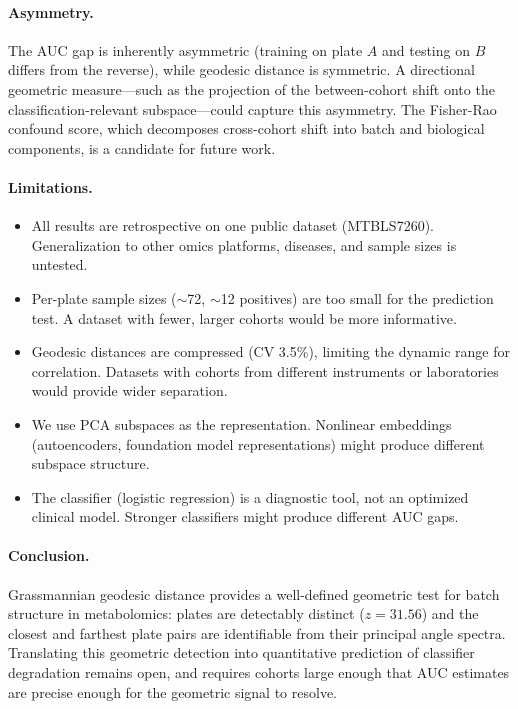 \documentclass{article}
\begin{document}
\paragraph{Asymmetry.} The AUC gap is inherently asymmetric (training on plate $A$ and testing on $B$ differs from the reverse), while geodesic distance is symmetric. A directional geometric measure---such as the projection of the between-cohort shift onto the classification-relevant subspace---could capture this asymmetry. The Fisher-Rao confound score, which decomposes cross-cohort shift into batch and biological components, is a candidate for future work.

\paragraph{Limitations.}

\begin{itemize}
\item All results are retrospective on one public dataset (MTBLS7260). Generalization to other omics platforms, diseases, and sample sizes is untested.
\item Per-plate sample sizes ($\sim$72, $\sim$12 positives) are too small for the prediction test. A dataset with fewer, larger cohorts would be more informative.
\item Geodesic distances are compressed (CV 3.5\%), limiting the dynamic range for correlation. Datasets with cohorts from different instruments or laboratories would provide wider separation.
\item We use PCA subspaces as the representation. Nonlinear embeddings (autoencoders, foundation model representations) might produce different subspace structure.
\item The classifier (logistic regression) is a diagnostic tool, not an optimized clinical model. Stronger classifiers might produce different AUC gaps.
\end{itemize}

\paragraph{Conclusion.} Grassmannian geodesic distance provides a well-defined geometric test for batch structure in metabolomics: plates are detectably distinct ($z = 31.56$) and the closest and farthest plate pairs are identifiable from their principal angle spectra. Translating this geometric detection into quantitative prediction of classifier degradation remains open, and requires cohorts large enough that AUC estimates are precise enough for the geometric signal to resolve.



\end{document}
